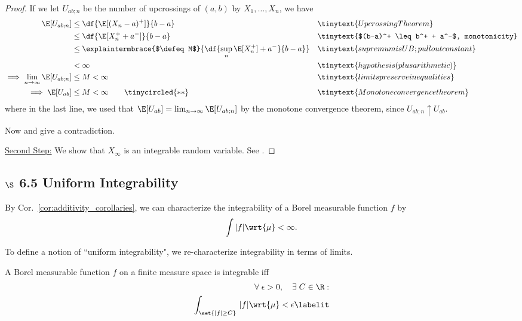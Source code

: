 \documentclass{article} %
\begin{document}
\begin{proof}
If we let $U_{ab;n}$ be the number of upcrossings of $(a,b)$ by $X_1, \hdots, X_n$, we have
%
\begin{align*}
\E[U_{ab;n}] &\leq \df{\E[(X_n-a)^+]}{b-a} && \tinytext{Upcrossing Theorem} \\
&\leq \df{\E[X_n^+ + a^-]}{b-a} && \tinytext{$(b-a)^+ \leq b^+ + a^-$, monotonicity} \\
& \leq \explaintermbrace{$\defeq M$}{\df{\sup_n \E[X_n^+] + a^-}{b-a}} && \tinytext{supremum is UB; pull out constant} \\
& < \infty && \tinytext{hypothesis (plus  arithmetic)} \\
\implies \lim_{n \to \infty} \E[U_{ab;n}] & \leq M < \infty  && \tinytext{limits preserve inequalities}  \\
\implies \E[U_{ab}] & \leq M < \infty \qquad \tinycircled{**} && \tinytext{Monotone convergence theorem}  
\end{align*} 
%
where in the last line, we used that   $\E[U_{ab}] =\lim_{n \to \infty} \E[U_{ab;n}]$ by the monotone convergence theorem, since  $U_{ab;n} \uparrow U_{ab}$.

Now \tinycircled{*} and \tinycircled{**} give a contradiction. 

\underline{Second Step:} We show that $X_\infty$ is an integrable random variable.  See \cite[pp.260]{ash2000probability}.
\end{proof}

\subsection{ $\S$ 6.5 Uniform Integrability}

By Cor.~\ref{cor:additivity_corollaries}, we can characterize the integrability of a Borel measurable function $f$ by 
\[ \int |f| \wrt{\mu} < \infty.\]

To define a notion of ``uniform integrability", we re-characterize integrability in terms of limits. 

\begin{proposition}
A Borel measurable function $f$ on a finite measure space is integrable iff 
\begin{align*}
\forall \; \epsilon >0, \quad  \exists \; C \in \R : \\
\int_{\set{|f| \geq C}} \, |f| \wrt{\mu} < \epsilon \labelit \label{eqn:alternate_characterization_of_integrability}
\end{align*}
\label{prop:characterization_of_integrability_in_terms_of_limits}
\end{proposition}
\end{document}
